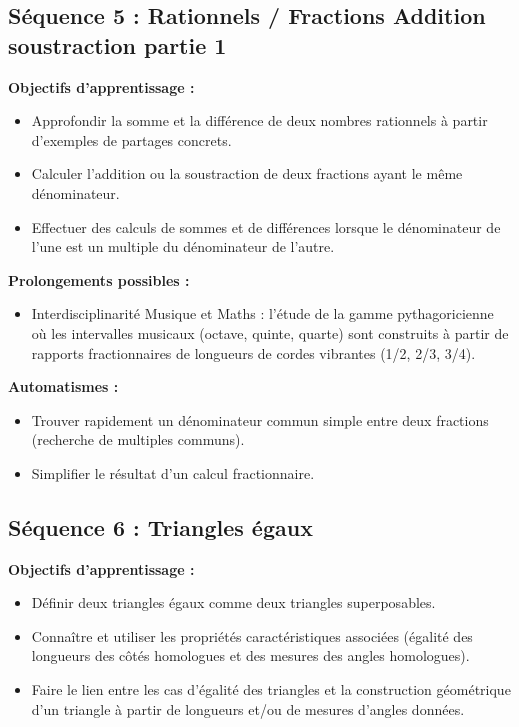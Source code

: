 \documentclass[11pt,a4paper]{article}
\begin{document}
\subsection{Séquence 5 : Rationnels / Fractions Addition soustraction partie 1}
\textbf{Objectifs d’apprentissage :}
\begin{itemize}
    \item Approfondir la somme et la différence de deux nombres rationnels à partir d'exemples de partages concrets.
    \item Calculer l’addition ou la soustraction de deux fractions ayant le même dénominateur.
    \item Effectuer des calculs de sommes et de différences lorsque le dénominateur de l'une est un multiple du dénominateur de l'autre.
\end{itemize}

\textbf{Prolongements possibles :}
\begin{itemize}
    \item Interdisciplinarité Musique et Maths : l'étude de la gamme pythagoricienne où les intervalles musicaux (octave, quinte, quarte) sont construits à partir de rapports fractionnaires de longueurs de cordes vibrantes (1/2, 2/3, 3/4).
\end{itemize}

\textbf{Automatismes :}
\begin{itemize}
    \item Trouver rapidement un dénominateur commun simple entre deux fractions (recherche de multiples communs).
    \item Simplifier le résultat d'un calcul fractionnaire.
\end{itemize}

\subsection{Séquence 6 : Triangles égaux}
\textbf{Objectifs d’apprentissage :}
\begin{itemize}
    \item Définir deux triangles égaux comme deux triangles superposables.
    \item Connaître et utiliser les propriétés caractéristiques associées (égalité des longueurs des côtés homologues et des mesures des angles homologues).
    \item Faire le lien entre les cas d’égalité des triangles et la construction géométrique d’un triangle à partir de longueurs et/ou de mesures d’angles données.
\end{itemize}
\end{document}
